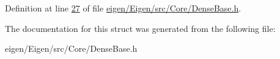 Definition at line \hyperlink{eigen_2_eigen_2src_2_core_2_dense_base_8h_source_l00027}{27} of file \hyperlink{eigen_2_eigen_2src_2_core_2_dense_base_8h_source}{eigen/\+Eigen/src/\+Core/\+Dense\+Base.\+h}.



The documentation for this struct was generated from the following file\+:\begin{DoxyCompactItemize}
\item 
eigen/\+Eigen/src/\+Core/\+Dense\+Base.\+h\end{DoxyCompactItemize}
